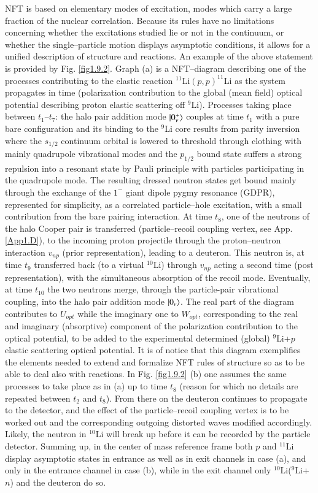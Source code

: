 NFT is based on elementary modes of excitation, modes which carry a large fraction of the nuclear correlation. Because its rules have no limitations concerning whether the excitations studied lie or not in the continuum, or whether the single--particle motion displays asymptotic conditions, it allows for a unified description of structure and reactions. An example of the above statement is provided by Fig. \ref{fig1.9.2}. Graph (a) is a NFT--diagram describing one of the processes contributing to the elastic
reaction $^{11}$Li$(p,p)^{11}$Li as the system propagates in time (polarization contribution to
the global (mean field) optical potential describing proton elastic scattering off $^{9}$Li). Processes taking place between $t_1$--$t_7$:
the halo pair addition mode $|{0^+_\nu} \rangle$ couples at time $t_1$ with a pure bare configuration
and its binding to the $^9$Li core results from parity inversion where the $s_{1/2}$ continuum
orbital is lowered to threshold through clothing with mainly quadrupole vibrational
modes and the $p_{1/2}$ bound state suffers a strong repulsion into a resonant state by
Pauli principle with particles participating in the quadrupole mode. The resulting
dressed neutron states get bound mainly through the exchange of the $1^-$ giant dipole
pygmy resonance (GDPR), represented for simplicity, as a correlated particle--hole
excitation, with a small contribution from the bare pairing interaction. At time $t_8$, one of the neutrons of the halo Cooper pair is transferred (particle--recoil coupling vertex, see App. \ref{App1.D}), to the incoming proton projectile through the proton--neutron
interaction $v_{np}$ (prior representation), leading to a deuteron. This neutron is,
at time $t_9$ transferred back (to a virtual $^{10}$Li) through $v_{np}$ acting a second time (post
representation), with the simultaneous absorption of the recoil mode. Eventually, at
time $t_{10}$ the two neutrons merge, through the particle-pair vibrational coupling, into the
halo pair addition mode $|{0_\nu} \rangle$. The real part of the diagram contributes to $U_{opt}$ while the
imaginary one to $W_{opt}$, corresponding to the real and imaginary (absorptive) component
of the polarization contribution to the optical potential, to be added to the
experimental determined (global) $^9$Li+$p$ elastic scattering optical potential. It is of
notice that this diagram exemplifies  the elements needed to extend and formalize NFT rules of
structure so as to be able to deal also with reactions. In Fig. \ref{fig1.9.2} (b) one assumes the same processes to take place  as in (a) up to time $t_8$ (reason for which no details
are repeated between $t_2$ and $t_8$). From there on the deuteron continues to propagate to
the detector, and the effect of the particle--recoil coupling vertex is to be worked out and the corresponding outgoing distorted waves modified accordingly. Likely, the neutron in $^{10}$Li will break up
before it can be recorded by the particle detector. Summing up, in the center of mass reference frame both $p$ and $^{11}$Li
display asymptotic states in entrance as well as in exit channels in case (a), and only
in the entrance channel in case (b), while in the exit channel only $^{10}$Li($^9$Li+$n$) and the
deuteron do so. 


